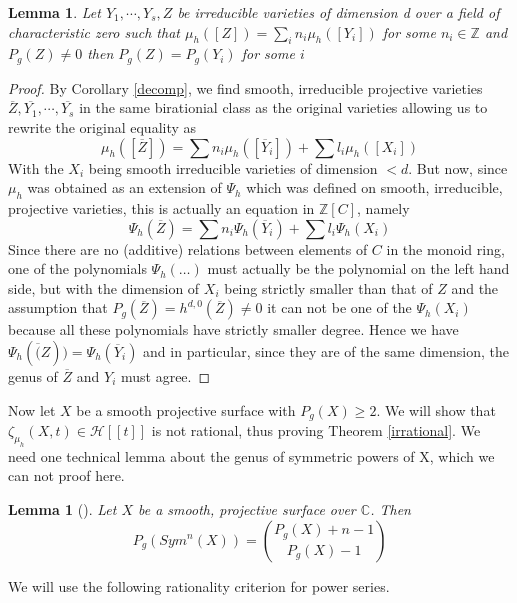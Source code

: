 \documentclass[11pt, a4paper, german]{article}
\theoremstyle{plain}
\newtheorem{lemma}[theorem]{Lemma}
\theoremstyle{definition}
\begin{document}
\begin{lemma}
    \label{same}
    Let $Y_1,\cdots,Y_s,Z$ be irreducible varieties of dimension d over a field of characteristic zero 
    such that $\mu_h([Z]) = \sum_i n_i \mu_h([Y_i])$ for some $n_i \in \mathbb{Z}$ and $P_g(Z) \neq 0$ then $P_g(Z) = P_g(Y_i)$ for some $i$
\end{lemma}
\begin{proof}
    By Corollary \ref{decomp}, we find smooth, irreducible projective varieties $\overline{Z},\overline{Y_1},\cdots, \overline{Y_s}$ in the same
    birationial class as the original varieties allowing us to rewrite the original equality as 
    \[
        \mu_h([\overline{Z}]) = \sum n_i\mu_h([\overline{Y}_i]) + \sum l_i \mu_h([X_i])
    \]
    With the $X_i$ being smooth irreducible varieties of dimension $<d$.
    But now, since $\mu_h$ was obtained as an extension of $\Psi_h$ which was defined on smooth, irreducible, projective varieties, this is
    actually an equation in $\mathbb{Z}[C]$, namely
    \[
        \Psi_h(\overline{Z}) = \sum n_i \Psi_h(\overline{Y}_i) + \sum l_i\Psi_h(X_i)
    \]
    Since there are no (additive) relations between elements of $C$ in the monoid ring, one of the polynomials $\Psi_h(\dots)$ must actually
    be the polynomial on the left hand side, but with the dimension of $X_i$ being strictly smaller than that of $Z$ and the assumption that
    $P_g(\overline{Z}) = h^{d,0}(\overline{Z}) \neq 0$ it can not be one of the $\Psi_h(X_i)$ because all these polynomials have strictly smaller
    degree. Hence we have $\Psi_h(\overline(Z)) = \Psi_h(\overline{Y}_i)$ and in particular, since they are of the same dimension, the genus of
    $\overline{Z}$ and $Y_i$ must agree.
\end{proof}

Now let $X$ be a smooth projective surface with $P_g(X) \geq 2$. We will show that $\zeta_{\mu_h}(X,t) \in \mathcal{H}[[t]]$ is not rational,
thus proving Theorem \ref{irrational}. We need one technical lemma about the genus of symmetric powers of X, which we can not proof here.

\begin{lemma}[{\cite[Lem. 3.8]{MR1996804}}]
    \label{genus}
    Let $X$ be a smooth, projective surface over $\mathbb{C}$. Then
    \[
        P_g(Sym^n(X)) = \binom{P_g(X) + n - 1}{P_g(X) - 1}
    \]
\end{lemma}

We will use the following rationality criterion for power series.
\end{document}
